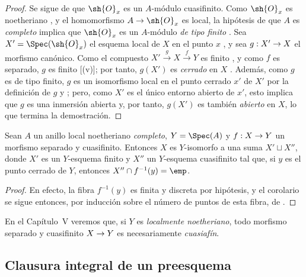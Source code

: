 \documentclass[oneside,10pt]{amsart}
\makeatletter
\newcommand{\ega@arrow}[2]{\mathchoice{#1}{#2}{#2}{#2}}
\renewcommand{\to}{\ega@arrow{\longrightarrow}{\rightarrow}}
\let\EGAOriginalLabel\label
\renewcommand{\label}[1]{\phantomsection\EGAOriginalLabel{#1}}
\makeatother
\begin{document}
\begin{proof}
Se sigue de  que $\sh{O}_x$ es un $A$-módulo cuasifinito.
Como $\sh{O}_x$ es noetheriano , y el homomorfismo $A\to\sh{O}_x$ es local, la hipótesis de que $A$ es \emph{completo} implica que $\sh{O}_x$ es un $A$-módulo \emph{de tipo finito} .
Sea $X'=\Spec(\sh{O}_x)$ el esquema local de $X$ en el punto $x$ , y sea $g:X'\to X$ el morfismo canónico.
Como el compuesto $X'\xrightarrow{g}X\xrightarrow{f}Y$ es finito , y como $f$ es separado, $g$ es finito [(v)]; por tanto, $g(X')$ es \emph{cerrado} en $X$ .
Además, como $g$ es de tipo finito, $g$ es un isomorfismo local en el punto cerrado $x'$ de $X'$ por la definición de $g$ y ;
pero, como $X'$ es el único entorno abierto de $x'$, esto implica que $g$ es una inmersión abierta y, por tanto, $g(X')$ es también \emph{abierto} en $X$, lo que termina la demostración.
\end{proof}

\begin{corollary}[6.2.6]
\label{II.6.2.6}
Sean $A$ un anillo local noetheriano \emph{completo}, $Y=\Spec(A)$ y $f:X\to Y$ un morfismo separado y cuasifinito.
Entonces $X$ es $Y$-isomorfo a una suma $X'\sqcup X''$, donde $X'$ es un $Y$-esquema finito y $X''$ un $Y$-esquema cuasifinito tal que, si $y$ es el punto cerrado de $Y$, entonces $X''\cap f^{-1}(y)=\emp$.
\end{corollary}

\begin{proof}
En efecto, la fibra $f^{-1}(y)$ es finita y discreta por hipótesis, y el corolario se sigue entonces, por inducción sobre el número de puntos de esta fibra, de .
\end{proof}

\begin{remark}[6.2.7]
\label{II.6.2.7}
En el Capítulo~V veremos que, si $Y$ es \emph{localmente noetheriano}, todo morfismo separado y cuasifinito $X\to Y$ es necesariamente \emph{cuasiafín}.
\end{remark}

\subsection{Clausura integral de un preesquema}
\label{subsection:II.6.3}
\end{document}
